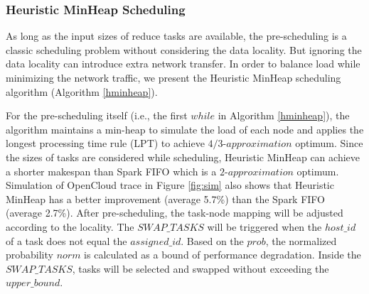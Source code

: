 \subsubsection{Heuristic MinHeap Scheduling}\label{h-minheap}

As long as the input sizes of reduce tasks are available, the pre-scheduling is a classic scheduling problem without considering the data locality. 
But ignoring the data locality can introduce extra network transfer. 
In order to balance load while minimizing the network traffic, we present the Heuristic MinHeap scheduling algorithm (Algorithm \ref{hminheap}).   

For the pre-scheduling itself (i.e., the first $while$ in Algorithm \ref{hminheap}), the algorithm maintains a min-heap to simulate the load of each node 
and applies the longest processing time rule (LPT) \cite{design} to achieve $4/3\text{-}approximation$ optimum. 
Since the sizes of tasks are considered while scheduling, Heuristic MinHeap can achieve a shorter makespan than Spark FIFO which is a $2\text{-}approximation$ optimum. 
Simulation of OpenCloud trace in Figure \ref{fig:sim} also shows that Heuristic MinHeap has a better improvement (average 5.7\%) than the Spark FIFO (average 2.7\%).
After pre-scheduling, the task-node mapping will be adjusted according to the locality. 
The $SWAP\_TASKS$ will be triggered when the $host\_id$ of a task does not equal the $assigned\_id$.
Based on the $prob$, the normalized probability $norm$ is calculated as a bound of performance degradation. 
Inside the $SWAP\_TASKS$, tasks will be selected and swapped without exceeding the $upper\_bound$. 
\noindent
